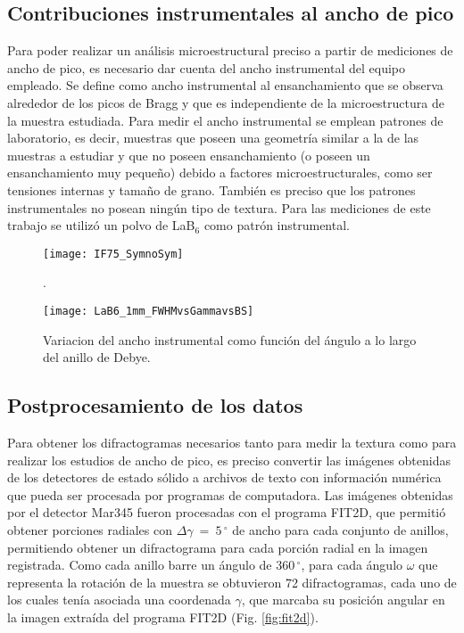 \subsection{Contribuciones instrumentales al ancho de pico}\label{SS:inst}
Para poder realizar un análisis microestructural preciso a partir de mediciones de ancho de pico, es necesario dar cuenta del ancho instrumental del equipo empleado.
Se define como ancho instrumental al ensanchamiento que se observa alrededor de los picos de Bragg y que es independiente de la microestructura de la muestra estudiada.
Para medir el ancho instrumental se emplean patrones de laboratorio, es decir, muestras que poseen una geometría similar a la de las muestras a estudiar y que no poseen ensanchamiento (o poseen un ensanchamiento muy pequeño) debido a factores microestructurales, como ser tensiones internas y tamaño de grano.
También es preciso que los patrones instrumentales no posean ningún tipo de textura.
Para las mediciones de este trabajo se utilizó un polvo de LaB$_6$ como patrón instrumental.

\begin{figure}[!htb]
  \centering
  \texttt{[image: IF75\_SymnoSym]}
  \caption{.}
  \label{fig:IF75NoSym}
\end{figure}


\begin{figure}[!htb]
  \centering
  \texttt{[image: LaB6\_1mm\_FWHMvsGammavsBS]}
  \caption{Variacion del ancho instrumental como función del ángulo a lo largo del anillo de Debye.}
  \label{fig:LaB6vsGamma}
\end{figure}

\newpage
\subsection{Postprocesamiento de los datos}\label{SS:MatPost}
Para obtener los difractogramas necesarios tanto para medir la textura como para realizar los estudios de ancho de pico, es preciso convertir las imágenes obtenidas de los detectores de estado sólido a archivos de texto con información numérica que pueda ser procesada por programas de computadora.
Las imágenes obtenidas por el detector Mar345 fueron procesadas con el programa FIT2D\cite{FIT2D}, que permitió obtener porciones radiales con $\Delta \gamma \ = \ 5\,^{\circ}$ de ancho para cada conjunto de anillos, permitiendo obtener un difractograma para cada porción radial en la imagen registrada.
Como cada anillo barre un ángulo de 360\,$^{\circ}$, para cada ángulo $\omega$ que representa la rotación de la muestra se obtuvieron 72 difractogramas, cada uno de los cuales tenía asociada una coordenada $\gamma$, que marcaba su posición angular en la imagen extraída del programa FIT2D (Fig. \ref{fig:fit2d}).

